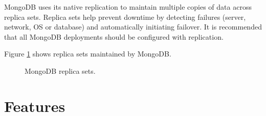 \documentclass[9pt,twocolumn,twoside]{styles/osajnl}
\begin{document}
MongoDB uses its native replication to maintain multiple copies of data across replica sets. Replica sets help prevent downtime by detecting failures (server, network, OS or database) and automatically initiating failover. It is recommended that all MongoDB deployments should be configured with replication.

Figure \ref{fig:figure2} shows replica sets maintained by MongoDB.

\begin{figure}[htbp]
\centering
{}
\caption{MongoDB replica sets.}
\label{fig:figure2}
\end{figure}

\section{Features}
\end{document}
